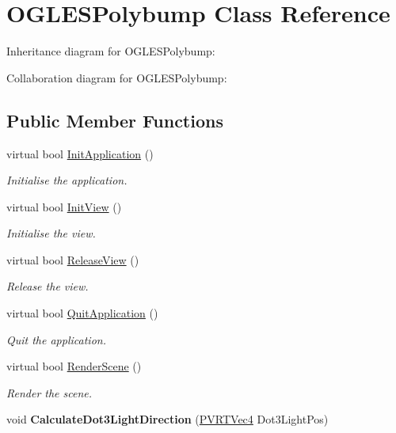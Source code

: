 \hypertarget{class_o_g_l_e_s_polybump}{\section{O\+G\+L\+E\+S\+Polybump Class Reference}
\label{class_o_g_l_e_s_polybump}
}


Inheritance diagram for O\+G\+L\+E\+S\+Polybump\+:


Collaboration diagram for O\+G\+L\+E\+S\+Polybump\+:
\subsection*{Public Member Functions}
\begin{DoxyCompactItemize}
\item 
virtual bool \hyperlink{class_o_g_l_e_s_polybump_a1c5d78b2f85eebec214ef8a9ff4e38a4}{Init\+Application} ()
\begin{DoxyCompactList}\small\item\em Initialise the application. \end{DoxyCompactList}\item 
virtual bool \hyperlink{class_o_g_l_e_s_polybump_a7ae04e8efee0d014143d5c70d322849b}{Init\+View} ()
\begin{DoxyCompactList}\small\item\em Initialise the view. \end{DoxyCompactList}\item 
virtual bool \hyperlink{class_o_g_l_e_s_polybump_ae1f32e387ca8fb2844efbf33361cfc97}{Release\+View} ()
\begin{DoxyCompactList}\small\item\em Release the view. \end{DoxyCompactList}\item 
virtual bool \hyperlink{class_o_g_l_e_s_polybump_a62bacd78a96f6b7aa4eb2cd2aa33462e}{Quit\+Application} ()
\begin{DoxyCompactList}\small\item\em Quit the application. \end{DoxyCompactList}\item 
virtual bool \hyperlink{class_o_g_l_e_s_polybump_a938affe0d075417452b4cbb10cdd9061}{Render\+Scene} ()
\begin{DoxyCompactList}\small\item\em Render the scene. \end{DoxyCompactList}\item 
\hypertarget{class_o_g_l_e_s_polybump_a77046db53650c26ee0a2a2f1c110a88c}{void {\bfseries Calculate\+Dot3\+Light\+Direction} (\hyperlink{struct_p_v_r_t_vec4}{P\+V\+R\+T\+Vec4} Dot3\+Light\+Pos)}\label{class_o_g_l_e_s_polybump_a77046db53650c26ee0a2a2f1c110a88c}


\end{DoxyCompactItemize}
